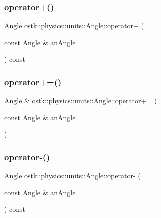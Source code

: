 \mbox{\label{classostk_1_1physics_1_1units_1_1_angle_acbc8a13c8f84ed77a741538aa1d8ce91}} 
\subsubsection{\texorpdfstring{operator+()}{operator+()}}
{\footnotesize\ttfamily \hyperlink{classostk_1_1physics_1_1units_1_1_angle}{Angle} ostk\+::physics\+::units\+::\+Angle\+::operator+ (\begin{DoxyParamCaption}\item[{const \hyperlink{classostk_1_1physics_1_1units_1_1_angle}{Angle} \&}]{an\+Angle }\end{DoxyParamCaption}) const}

\mbox{\label{classostk_1_1physics_1_1units_1_1_angle_a814933d09dc8cb6cb4a7a013386c2267}} 
\subsubsection{\texorpdfstring{operator+=()}{operator+=()}}
{\footnotesize\ttfamily \hyperlink{classostk_1_1physics_1_1units_1_1_angle}{Angle} \& ostk\+::physics\+::units\+::\+Angle\+::operator+= (\begin{DoxyParamCaption}\item[{const \hyperlink{classostk_1_1physics_1_1units_1_1_angle}{Angle} \&}]{an\+Angle }\end{DoxyParamCaption})}

\mbox{\label{classostk_1_1physics_1_1units_1_1_angle_adc4e27520c40a157d3cf868b1df07c1c}} 
\subsubsection{\texorpdfstring{operator-\/()}{operator-()}}
{\footnotesize\ttfamily \hyperlink{classostk_1_1physics_1_1units_1_1_angle}{Angle} ostk\+::physics\+::units\+::\+Angle\+::operator-\/ (\begin{DoxyParamCaption}\item[{const \hyperlink{classostk_1_1physics_1_1units_1_1_angle}{Angle} \&}]{an\+Angle }\end{DoxyParamCaption}) const}

